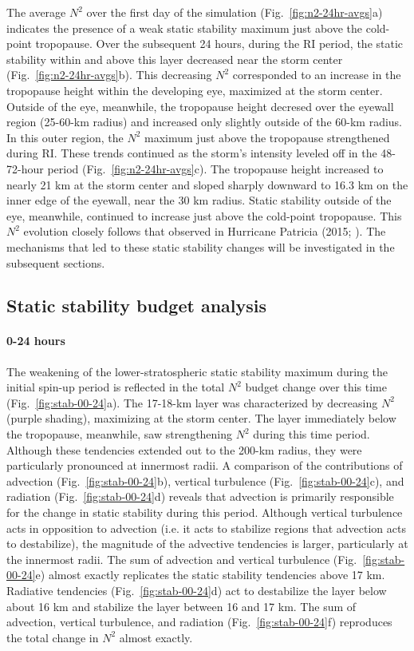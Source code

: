 \documentclass{ametsoc}
\begin{document}
The average $N^2$ over the first day of the simulation (Fig.~\ref{fig:n2-24hr-avgs}a) indicates the presence of a weak static stability maximum just above the cold-point tropopause.
Over the subsequent 24 hours, during the RI period, the static stability within and above this layer decreased near the storm center (Fig.~\ref{fig:n2-24hr-avgs}b).
This decreasing $N^2$ corresponded to an increase in the tropopause height within the developing eye, maximized at the storm center.
Outside of the eye, meanwhile, the tropopause height decresed over the eyewall region (25-60-km radius) and increased only slightly outside of the 60-km radius.
In this outer region, the $N^2$ maximum just above the tropopause strengthened during RI.
These trends continued as the storm's intensity leveled off in the 48-72-hour period (Fig.~\ref{fig:n2-24hr-avgs}c).
The tropopause height increased to nearly 21 km at the storm center and sloped sharply downward to 16.3 km on the inner edge of the eyewall, near the 30 km radius.
Static stability outside of the eye, meanwhile, continued to increase just above the cold-point tropopause.
This $N^2$ evolution closely follows that observed in Hurricane Patricia (2015; \citeauthor{DuranMolinari2018} \citeyear{DuranMolinari2018}).
The mechanisms that led to these static stability changes will be investigated in the subsequent sections.

 \subsection{Static stability budget analysis}

\paragraph{0-24 hours}
The weakening of the lower-stratospheric static stability maximum during the initial spin-up period is reflected in the total $N^2$ budget change over this time (Fig.~\ref{fig:stab-00-24}a).
The 17-18-km layer was characterized by decreasing $N^2$ (purple shading), maximizing at the storm center.
The layer immediately below the tropopause, meanwhile, saw strengthening $N^2$ during this time period.
Although these tendencies extended out to the 200-km radius, they were particularly pronounced at innermost radii.
A comparison of the contributions of advection (Fig.~\ref{fig:stab-00-24}b), vertical turbulence (Fig.~\ref{fig:stab-00-24}c), and radiation (Fig.~\ref{fig:stab-00-24}d) reveals that advection is primarily responsible for the change in static stability during this period.
Although vertical turbulence acts in opposition to advection (i.e. it acts to stabilize regions that advection acts to destabilize), the magnitude of the advective tendencies is larger, particularly at the innermost radii.
The sum of advection and vertical turbulence (Fig.~\ref{fig:stab-00-24}e) almost exactly replicates the static stability tendencies above 17 km.
Radiative tendencies (Fig.~\ref{fig:stab-00-24}d) act to destabilize the layer below about 16 km and stabilize the layer between 16 and 17 km.
The sum of advection, vertical turbulence, and radiation (Fig.~\ref{fig:stab-00-24}f) reproduces the total change in $N^2$ almost exactly.
\end{document}
